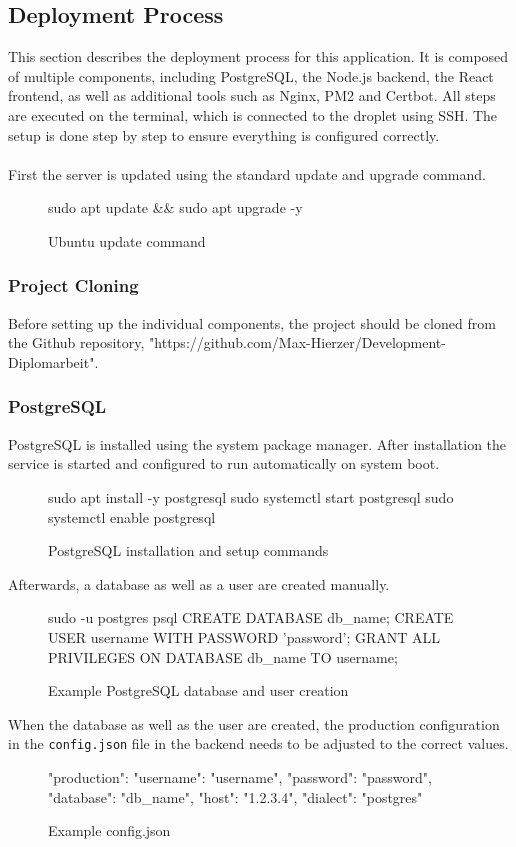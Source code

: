 \documentclass[a4paper,12pt]{report}
\begin{document}
\subsection{Deployment Process}
This section describes the deployment process for this application. It is composed of multiple components, including PostgreSQL, the Node.js backend, the React frontend, as well as additional tools such as Nginx, PM2 and Certbot. All steps are executed on the terminal, which is connected to the droplet using SSH. The setup is done step by step to ensure everything is configured correctly.\\\\
First the server is updated using the standard update and upgrade command.
\begin{figure}[H]
	\begin{terminal}
		sudo apt update && sudo apt upgrade -y
	\end{terminal}
	\caption{Ubuntu update command}
\end{figure}
\subsubsection{Project Cloning}
Before setting up the individual components, the project should be cloned from the Github repository, "https://github.com/Max-Hierzer/Development-Diplomarbeit".
\subsubsection{PostgreSQL}
PostgreSQL is installed using the system package manager. After installation the service is started and configured to run automatically on system boot.
\begin{figure}[H]
	\begin{terminal}
		sudo apt install -y postgresql
		sudo systemctl start postgresql
		sudo systemctl enable postgresql
	\end{terminal}
	\caption{PostgreSQL installation and setup commands}
\end{figure}
Afterwards, a database as well as a user are created manually.
\begin{figure}[H]
	\begin{terminal}
		sudo -u postgres psql
		CREATE DATABASE db_name;
		CREATE USER username WITH PASSWORD 'password';
		GRANT ALL PRIVILEGES ON DATABASE db_name TO username;
		\q
	\end{terminal}
	\caption{Example PostgreSQL database and user creation}
\end{figure}
\noindent
When the database as well as the user are created, the production configuration in the \texttt{config.json} file in the backend needs to be adjusted to the correct values.
\begin{figure}[H]
	\begin{terminal}
		"production": {
			"username": "username",
			"password": "password",
			"database": "db_name",
			"host": "1.2.3.4",
			"dialect": "postgres"
		}
	\end{terminal}
	\caption{Example config.json}
\end{figure}
\end{document}
